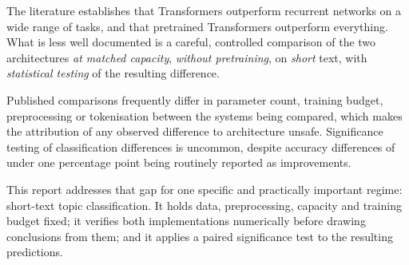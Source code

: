 The literature establishes that Transformers outperform recurrent networks on a wide range of
tasks, and that pretrained Transformers outperform everything. What is less well documented is a
careful, controlled comparison of the two architectures \emph{at matched capacity}, \emph{without
pretraining}, on \emph{short} text, with \emph{statistical testing} of the resulting difference.

Published comparisons frequently differ in parameter count, training budget, preprocessing or
tokenisation between the systems being compared, which makes the attribution of any observed
difference to architecture unsafe. Significance testing of classification differences is uncommon,
despite accuracy differences of under one percentage point being routinely reported as
improvements.

This report addresses that gap for one specific and practically important regime: short-text topic
classification. It holds data, preprocessing, capacity and training budget fixed; it verifies both
implementations numerically before drawing conclusions from them; and it applies a paired
significance test to the resulting predictions.
